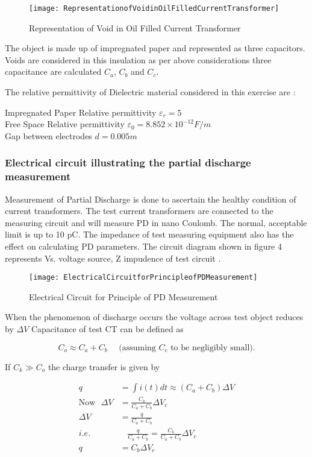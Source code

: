 \begin{figure}[h!]
\centering
\texttt{[image: RepresentationofVoidinOilFilledCurrentTransformer]}
\caption{Representation of Void in Oil Filled Current Transformer}
\label{fig:Representation of Void in Oil Filled Current Transformer}
\end{figure}

The object is made up of impregnated paper and represented as three capacitors. Voids are considered in this insulation as per above considerations three capacitance are calculated $C_a$, $C_b$ and $C_c$.

The relative permittivity of Dielectric material considered in this exercise are :

Impregnated Paper Relative permittivity $\varepsilon_r = 5$\\
Free Space Relative permittivity $ \varepsilon_0 = 8.852 \times 10^{-12} F/m$\\
Gap between electrodes $d = 0.005 m$

\subsubsection{Electrical circuit illustrating the partial discharge measurement}
Measurement of Partial Discharge is done to ascertain the healthy condition of current transformers. The test current transformers are connected to the measuring circuit and will measure PD in nano Coulomb. The normal, acceptable limit is up to 10 pC. The impedance of test measuring equipment also has the effect on calculating PD parameters. The circuit diagram shown in figure 4 represents Vs. voltage source, Z impudence of test circuit \cite{harrold1985influence}.

\begin{figure}[h!]
\centering
\texttt{[image: ElectricalCircuitforPrincipleofPDMeasurement]}
\caption{Electrical Circuit for Principle of PD Measurement}
\label{fig:Electrical Circuit for Principle of PD Measurement}
\end{figure}

When the phenomenon of discharge occurs the voltage across test object reduces by $\Delta V$ Capacitance of test CT can be defined as 

\[
C_o \approx C_a + C_b~~~~~~\text{(assuming } C_c \text{ to be negligibly small).} 
\]

If $C_k \gg C_o$ the charge transfer is given by 

\begin{align}
q &= \int i(t) dt \approx (C_a + C_b)\Delta V \\
\text{Now~~} \Delta V &= \frac{C_b}{C_a + C_b} \Delta V_c \\
\Delta V &= \frac{q}{C_a + C_b}\\
i.e. &~~~~\frac{q}{C_a + C_b} = \frac{C_b}{C_a + C_b}  \Delta V_c \\
q &= C_b \Delta V_c
\end{align}

